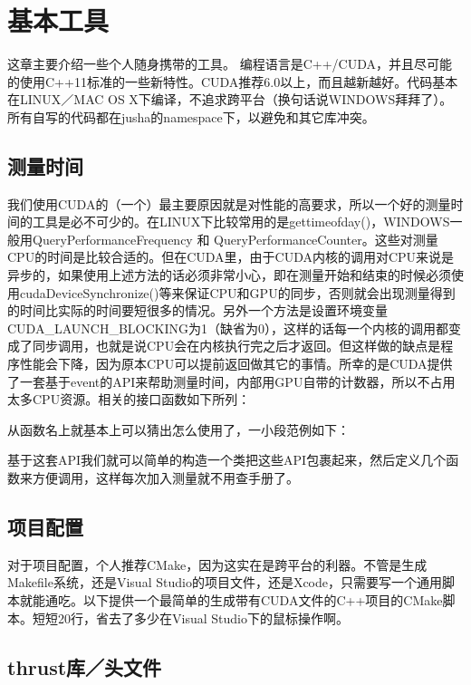 
\chapter{基本工具}

这章主要介绍一些个人随身携带的工具。 编程语言是C++/CUDA，并且尽可能的使用C++11标准的一些新特性。CUDA推荐6.0以上，而且越新越好。代码基本在LINUX／MAC OS X下编译，不追求跨平台（换句话说WINDOWS拜拜了）。所有自写的代码都在jusha的namespace下，以避免和其它库冲突。

\section{测量时间}
我们使用CUDA的（一个）最主要原因就是对性能的高要求，所以一个好的测量时间的工具是必不可少的。在LINUX下比较常用的是gettimeofday()，WINDOWS一般用QueryPerformanceFrequency 和 QueryPerformanceCounter。这些对测量CPU的时间是比较合适的。但在CUDA里，由于CUDA内核的调用对CPU来说是异步的，如果使用上述方法的话必须非常小心，即在测量开始和结束的时候必须使用cudaDeviceSynchronize()等来保证CPU和GPU的同步，否则就会出现测量得到的时间比实际的时间要短很多的情况。另外一个方法是设置环境变量CUDA\_LAUNCH\_BLOCKING为1（缺省为0），这样的话每一个内核的调用都变成了同步调用，也就是说CPU会在内核执行完之后才返回。但这样做的缺点是程序性能会下降，因为原本CPU可以提前返回做其它的事情。所幸的是CUDA提供了一套基于event的API来帮助测量时间，内部用GPU自带的计数器，所以不占用太多CPU资源。相关的接口函数如下所列：
\myvspace


从函数名上就基本上可以猜出怎么使用了，一小段范例如下：
\myvspace

 
基于这套API我们就可以简单的构造一个类把这些API包裹起来，然后定义几个函数来方便调用，这样每次加入测量就不用查手册了。

\section{项目配置}
对于项目配置，个人推荐CMake，因为这实在是跨平台的利器。不管是生成Makefile系统，还是Visual Studio的项目文件，还是Xcode，只需要写一个通用脚本就能通吃。以下提供一个最简单的生成带有CUDA文件的C++项目的CMake脚本。短短20行，省去了多少在Visual Studio下的鼠标操作啊。
\myvspace


\section{thrust库／头文件}

